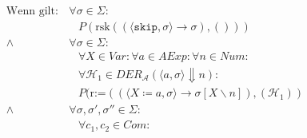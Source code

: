 																	\begin{align*}
																		\text{Wenn gilt:} & \,\forall \sigma \in \Sigma : \tag{Zustände}                                                                                                                                                                                                              \\
																		                  & \quad P(\text{rsk}((\langle \texttt{skip}, \sigma \rangle \rightarrow \sigma), ())) \tag{Konklusion}                                                                                                                                                      \\
																		\land             & \,\forall \sigma \in \Sigma : \tag{Zustände}                                                                                                                                                                                                              \\
																		                  & \quad \forall X \in \textit{Var} : \forall a \in \textit{AExp} : \forall n \in \textit{Num} : \tag{Ausdrucksbestandteile}                                                                                                                                 \\
																		                  & \quad \forall \mathcal{H} _ 1 \in \textit{DER} _ \mathcal{A} (\langle a, \sigma \rangle \Downarrow n) : \tag{Kalkülfremde Herleitungen}                                                                                                                   \\
																		                  & \quad P(\text{r:=}((\langle X \coloneqq a, \sigma \rangle \rightarrow \sigma[X \backslash n]), (\mathcal{H} _ 1)) \tag{Konklusion}                                                                                                                        \\
																		\land             & \,\forall \sigma, \sigma', \sigma'' \in \Sigma : \tag{Zustände}                                                                                                                                                                                           \\
																		                  & \quad \forall c _ 1, c _ 2 \in \textit{Com} : \tag{Ausdrucksbestandteile}                                                                                                                                                                                 \\

\end{align*}
